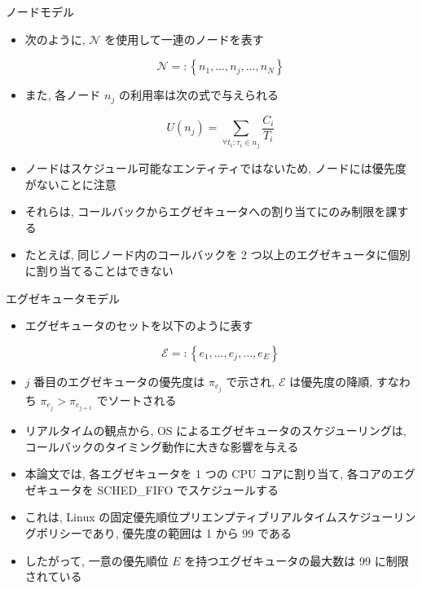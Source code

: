 \begin{frame}{ノードモデル}
    \begin{itemize}
        \item 次のように, $\mathcal{N}$ を使用して一連のノードを表す

              \begin{equation*}
                  \mathcal{N}=:\left\{n_{1}, \ldots, n_{j}, \ldots, n_{N}\right\}
              \end{equation*}

        \item また, 各ノード $n_{j}$ の利用率は次の式で与えられる

              \begin{equation*}
                  U\left(n_{j}\right)=\sum_{\forall t_{i}: \tau_{i} \in n_{j}} \frac{C_{i}}{T_{i}}
              \end{equation*}

        \item ノードはスケジュール可能なエンティティではないため, ノードには優先度がないことに注意
\item それらは, コールバックからエグゼキュータへの割り当てにのみ制限を課する
\item たとえば, 同じノード内のコールバックを 2 つ以上のエグゼキュータに個別に割り当てることはできない
    \end{itemize}
\end{frame}

\begin{frame}{エグゼキュータモデル}
    \begin{itemize}
        \item エグゼキュータのセットを以下のように表す

              \begin{equation*}
                  \mathcal{E}=:\left\{e_{1}, \ldots, e_{j}, \ldots, e_{E}\right\}
              \end{equation*}

        \item $j$ 番目のエグゼキュータの優先度は $\pi_{e_{j}}$ で示され, $\mathcal{E}$ は優先度の降順, すなわち $\pi_{e_{j}}>\pi_{e_{j+1}}$ でソートされる
\item リアルタイムの観点から, OS によるエグゼキュータのスケジューリングは, コールバックのタイミング動作に大きな影響を与える
\item 本論文では, 各エグゼキュータを 1 つの CPU コアに割り当て, 各コアのエグゼキュータを SCHED\_FIFO でスケジュールする
\item これは, Linux の固定優先順位プリエンプティブリアルタイムスケジューリングポリシーであり, 優先度の範囲は 1 から 99 である
\item したがって, 一意の優先順位 $E$ を持つエグゼキュータの最大数は 99 に制限されている
    \end{itemize}
\end{frame}

